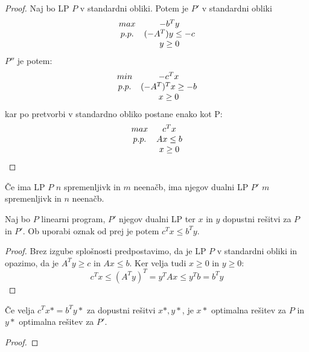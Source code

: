 \documentclass[11pt, a4paper]{article}
\begin{document}
    \begin{proof}
        Naj bo LP \(P\) v standardni obliki. Potem je  \(P'\) v standardni obliki
        \[
            \begin{array}{ c c }
                max & -b^Ty \\
                p.p. & (-A^T)y \le -c \\
                & y \ge 0 \\
            \end{array}
        \]
        \(P''\) je potem:
        \[
            \begin{array}{ c c }
                min & -c^Tx \\
                p.p. & (-A^T)^Tx \ge -b \\
                & x \ge 0 \\
            \end{array}
        \]
        kar po pretvorbi v standardno obliko postane enako kot P:
        \[
            \begin{array}{ c c }
                max & c^Tx \\
                p.p. & Ax \le b \\
                & x \ge 0 \\
            \end{array}
        \]
    \end{proof}

    \begin{remark}
        Če ima LP \(P\) \(n\) spremenljivk in \(m\) neenačb, ima njegov dualni LP \(P'\) \(m\) spremenljivk in \(n\) neenačb.
    \end{remark}

    \begin{theorem}
        Naj bo \(P\) linearni program, \(P'\) njegov dualni LP ter \(x\) in \(y\) dopustni rešitvi za \(P\) in \(P'\). Ob uporabi oznak od prej je potem \(c^Tx \le b^Ty\).
    \end{theorem}

    \begin{proof}
        Brez izgube splošnosti predpostavimo, da je LP \(P\) v standardni obliki in opazimo, da je \(A^Ty \ge c\) in \(Ax \le b\). Ker velja tudi \(x \ge 0\) in \(y \ge 0\):
        \[c^Tx \le (A^Ty)^T = y^TAx \le y^Tb = b^Ty\]
    \end{proof}

    \begin{corollary}
        Če velja \(c^Tx* = b^Ty*\) za dopustni rešitvi \(x*,y*\), je \(x*\) optimalna rešitev za \(P\) in \(y*\) optimalna rešitev za \(P'\).
    \end{corollary}

    \begin{proof}
        
    \end{proof}
\end{document}
